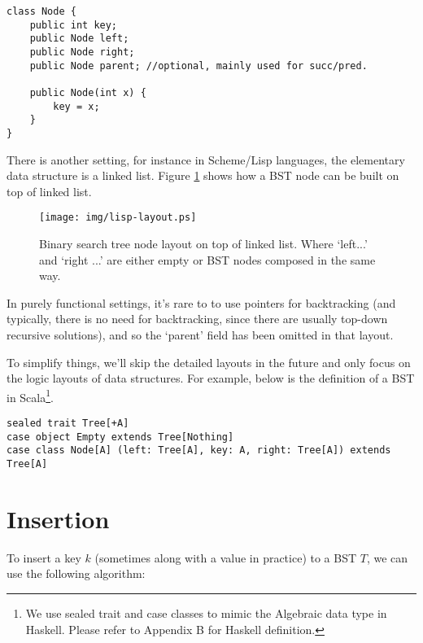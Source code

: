 \documentclass{article}
\begin{document}
\lstset{language=Java}
\begin{lstlisting}
class Node {
    public int key;
    public Node left;
    public Node right;
    public Node parent; //optional, mainly used for succ/pred.

    public Node(int x) {
        key = x;
    }
}
\end{lstlisting}

There is another setting, for instance in Scheme/Lisp languages, the elementary
data structure is a linked list. Figure \ref{fig:lisp-layout} shows how a BST node can be built on top of linked list.

\begin{figure}[htbp]
       \begin{center}
        \texttt{[image: img/lisp-layout.ps]}
        \caption{Binary search tree node layout on top of linked list. Where `left...' and `right ...' are either empty or BST nodes composed in the same way.} \label{fig:lisp-layout}
       \end{center}
\end{figure}

In purely functional settings, it's rare to to use pointers for backtracking (and typically, there is no need for backtracking, since there are usually top-down recursive solutions), and so the `parent' field has been omitted in that layout.

To simplify things, we'll skip the detailed layouts in the future and only
focus on the logic layouts of data structures. For example, below is the definition
of a BST in Scala\footnote{We use sealed trait and case classes to mimic the Algebraic data type in Haskell. Please refer to Appendix B for Haskell definition.}.

\lstset{language=Scala}
\begin{lstlisting}
sealed trait Tree[+A]
case object Empty extends Tree[Nothing]
case class Node[A] (left: Tree[A], key: A, right: Tree[A]) extends Tree[A]
\end{lstlisting}

\section{Insertion}

To insert a key $k$ (sometimes along with a value in practice) to a BST $T$, we can use the following algorithm:
\end{document}
